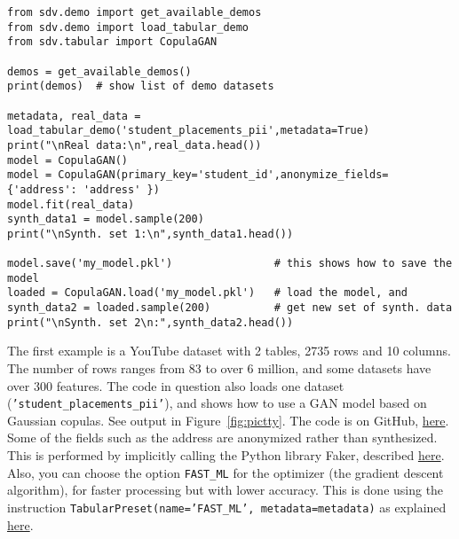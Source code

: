 \documentclass[oneside,10pt]{book}
\begin{document}
\begin{lstlisting}
from sdv.demo import get_available_demos
from sdv.demo import load_tabular_demo
from sdv.tabular import CopulaGAN

demos = get_available_demos()
print(demos)  # show list of demo datasets

metadata, real_data = load_tabular_demo('student_placements_pii',metadata=True)
print("\nReal data:\n",real_data.head())
model = CopulaGAN()
model = CopulaGAN(primary_key='student_id',anonymize_fields={'address': 'address' })
model.fit(real_data)
synth_data1 = model.sample(200)
print("\nSynth. set 1:\n",synth_data1.head())

model.save('my_model.pkl')                # this shows how to save the model
loaded = CopulaGAN.load('my_model.pkl')   # load the model, and
synth_data2 = loaded.sample(200)          # get new set of synth. data
print("\nSynth. set 2\n:",synth_data2.head())
\end{lstlisting}\vspace{1ex}

The first example is a YouTube dataset with 2 tables, 2735 rows and 10 columns. The number of rows ranges from 83 to over 6 million, and some datasets have over 300 features. The code in question also loads one dataset (\texttt{'student\_placements\_pii'}), and shows how to use a GAN model based on \textcolor{index}{Gaussian copulas}. See output in Figure~\ref{fig:pictty}. The code is on GitHub, \href{https://github.com/VincentGranville/Main/blob/main/GAN_copula_SDV.py}{here}. Some of the fields such as the address are anonymized rather than synthesized. This is performed by
 implicitly calling the Python library Faker, described \href{https://pypi.org/project/Faker/}{here}.
Also, you can choose the option \texttt{FAST\_ML} for the optimizer (the gradient descent algorithm), for faster processing but with lower
 accuracy. This is done using the instruction
\texttt{TabularPreset(name='FAST\_ML', metadata=metadata)} as explained \href{https://medium.com/@davide.gazze/sdv-generate-synthetic-data-using-gan-and-python-4c26a1e4b3c2}{here}.
\end{document}
